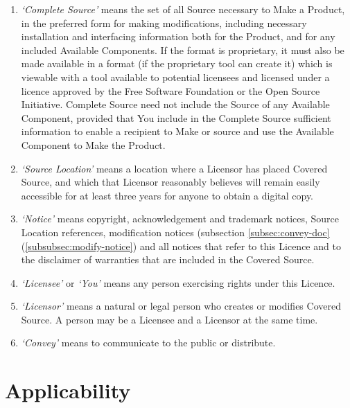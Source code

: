 \documentclass[10pt, a4paper]{article}
\begin{document}
\begin{enumerate}[label=\ref*{sec:definitions}.\arabic*]
\begin{enumerate}[label=\alph*)]
\begin{enumerate}[label=\roman*)]
    	
\end{enumerate}

\end{enumerate}
    	
\item \emph{`Complete Source'} means the set of all Source necessary to Make a Product, in the preferred form for making modifications, including necessary installation and interfacing information both for the Product, and for any included Available Components. If the format is proprietary, it must also be made available in a format (if the proprietary tool can create it) which is viewable with a tool available to potential licensees and licensed under a licence approved by the Free Software Foundation or the Open Source Initiative. Complete Source need not include the Source of any Available Component,  provided that You include in the Complete Source sufficient information to enable a recipient to Make or source and use the Available Component to Make the Product.


\item \emph{`Source Location'} means a location where a Licensor has placed Covered Source, and which that Licensor reasonably believes will remain easily accessible for at least three years for anyone to obtain a digital copy.  

\item \emph{`Notice'} means copyright, acknowledgement and trademark notices, Source Location references, modification notices (subsection \ref*{subsec:convey-doc}(\ref*{subsubsec:modify-notice}) and all notices that refer to this Licence and to the disclaimer of warranties that are included in the Covered Source.

\item \emph{`Licensee'} or \emph{`You'} means any person exercising rights under this Licence.

\item \emph{`Licensor'} means a natural or legal person who creates or modifies Covered Source. A person may be a Licensee and a Licensor at the same time.

\item \emph{`Convey'} means to communicate to the public or distribute.

\end{enumerate}

\section{Applicability}
\label{sec:applicability}
\end{document}
